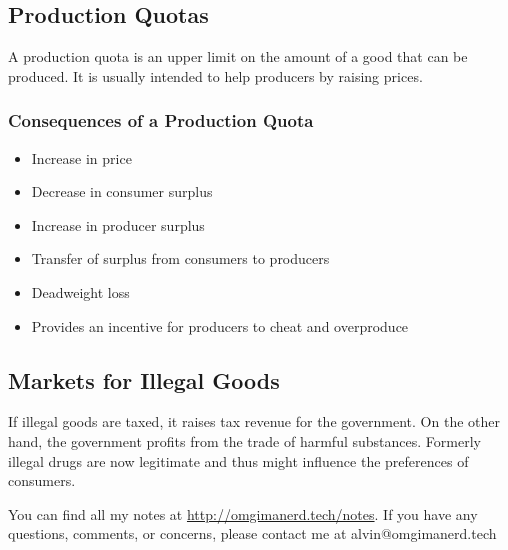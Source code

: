 \documentclass{article}
\begin{document}
\subsection{Production Quotas}
A production quota is an upper limit on the amount of a good that can be
produced. It is usually intended to help producers by raising prices.

\subsubsection{Consequences of a Production Quota}
\begin{itemize}
  \item Increase in price
  \item Decrease in consumer surplus
  \item Increase in producer surplus
  \item Transfer of surplus from consumers to producers
  \item Deadweight loss
  \item Provides an incentive for producers to cheat and overproduce
\end{itemize}

\subsection{Markets for Illegal Goods}
If illegal goods are taxed, it raises tax revenue for the government. On the
other hand, the government profits from the trade of harmful substances.
Formerly illegal drugs are now legitimate and thus might influence the
preferences of consumers.

\begin{center}
  You can find all my notes at \url{http://omgimanerd.tech/notes}. If you have
  any questions, comments, or concerns, please contact me at
  alvin@omgimanerd.tech
\end{center}
\end{document}
